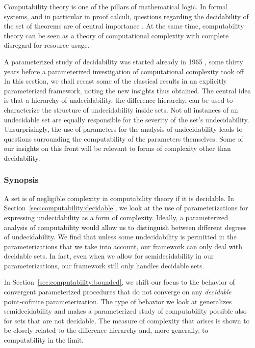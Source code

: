 \label{sec:computability}%

Computability theory \parencite{rogers1967theory} is one of the pillars of mathematical logic.
In formal systems, and in particular in proof calculi, questions regarding the decidability of the set of theorems are of central importance \parencite{kleene1967mathematical,troelstra2000basic}.
At the same time, computability theory can be seen as a theory of computational complexity with complete disregard for resource usage.

A parameterized study of decidability was started already in 1965 \parencite{putnam1965trial,gold1965limiting}, some thirty years before a parameterized investigation of computational complexity took off.
In this section, we shall recast some of the classical results in an explicitly parameterized framework, noting the new insights thus obtained.
The central idea is that a hierarchy of undecidability, the difference hierarchy, can be used to characterize the structure of undecidability inside sets.
Not all instances of an undecidable set are equally responsible for the severity of the set's undecidability.
Unsurprisingly, the use of parameters for the analysis of undecidability leads to questions surrounding the computability of the parameters themselves.
Some of our insights on this front will be relevant to forms of complexity other than decidability.

\subsubsection*{Synopsis}
A set is of negligible complexity in computability theory if it is decidable.
In Section~\ref{sec:computability:decidable}, we look at the use of parameterizations for expressing undecidability as a form of complexity.
Ideally, a parameterized analysis of computability would allow us to distinguish between different degrees of undecidability.
We find that unless some undecidability is permitted in the parameterizations that we take into account, our framework can only deal with decidable sets.
In fact, even when we allow for semidecidability in our parameterizations, our framework still only handles decidable sets.

In Section~\ref{sec:computability:bounded}, we shift our focus to the behavior of convergent parameterized procedures that do not converge on any \emph{decidable} point-cofinite parameterization.
The type of behavior we look at generalizes semidecidability and makes a parameterized study of computability possible also for sets that are not decidable.
The measure of complexity that arises is shown to be closely related to the difference hierarchy and, more generally, to computability in the limit.

